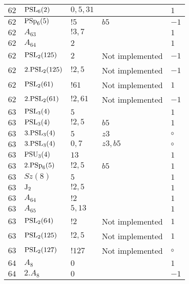 \documentclass[a4paper, 11pt]{article}
\begin{document}
\begin{longtable}{lllll}
        $ 62 $ & $ {\rm PSL}_{6}(2) $ & $ 0,5,31 $ & $ ~ $ & $ 1$ \\ \hline
        $ 62 $ & $ {\rm PSp}_{6}(5) $ & $ ! 5 $ & $ b5 $ & $ -1$ \\ \hline
        $ 62 $ & $ A_{63} $ & $ !3, 7 $ & $ ~ $ & $ 1$ \\ \hline
        $ 62 $ & $ A_{64} $ & $ 2 $ & $ ~ $ & $ 1$ \\ \hline
        $ 62 $ & $ {\rm PSL}_{2}(125) $ & $ 2 $ &  Not implemented & $ -1$ \\ \hline
        $ 62 $ & $ 2.{\rm PSL}_{2}(125) $ & $ !2, 5 $ &  Not implemented & $ -1$ \\ \hline
        $ 62 $ & $ {\rm PSL}_{2}(61) $ & $ !61 $ &  Not implemented & $ 1$ \\ \hline
        $ 62 $ & $ 2.{\rm PSL}_{2}(61) $ & $ !2, 61 $ &  Not implemented & $ -1$ \\ \hline
        $ 63 $ & $ {\rm PSL}_{3}(4) $ & $ 5 $ & $ ~ $ & $ 1$ \\ \hline
        $ 63 $ & $ {\rm PSL}_{3}(4) $ & $ ! 2,5 $ & $ b5 $ & $ 1$ \\ \hline
        $ 63 $ & $ 3.{\rm PSL}_{3}(4) $ & $ 5 $ & $ z3 $ &  $\circ$ \\ \hline
        $ 63 $ & $ 3.{\rm PSL}_{3}(4) $ & $ 0,7 $ & $ z3, b5 $ &  $\circ$ \\ \hline
        $ 63 $ & $ {\rm PSU}_{3}(4) $ & $ 13 $ & $ ~ $ & $ 1$ \\ \hline
        $ 63 $ & $ 2.{\rm PSp}_{6}(5) $ & $ ! 2,5 $ & $ b5 $ & $ 1$ \\ \hline
        $ 63 $ & $ Sz(8) $ & $ 5 $ & $ ~ $ & $ 1$ \\ \hline
        $ 63 $ & $ {\rm J}_2 $ & $ ! 2,5 $ & $ ~ $ & $ 1$ \\ \hline
        $ 63 $ & $ A_{64} $ & $ !2 $ & $ ~ $ & $ 1$ \\ \hline
        $ 63 $ & $ A_{65} $ & $ 5, 13 $ & $ ~ $ & $ 1$ \\ \hline
        $ 63 $ & $ {\rm PSL}_{2}(64) $ & $ !2 $ &  Not implemented & $ 1$ \\ \hline
        $ 63 $ & $ {\rm PSL}_{2}(125) $ & $ !2, 5 $ &  Not implemented & $ 1$ \\ \hline
        $ 63 $ & $ {\rm PSL}_{2}(127) $ & $ !127 $ &  Not implemented &  $\circ$ \\ \hline
        $ 64 $ & $ A_{8} $ & $ 0 $ & $ ~ $ & $ 1$ \\ \hline
        $ 64 $ & $ 2.A_{8} $ & $ 0 $ & $ ~ $ & $ -1$ \\ \hline

\end{longtable}
\end{document}
